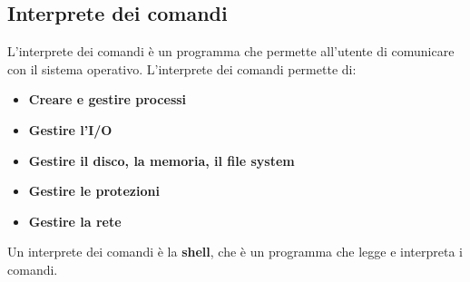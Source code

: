 \documentclass[a4paper]{article}
\begin{document}
\subsection{Interprete dei comandi}
L'interprete dei comandi è un programma che permette all'utente di comunicare con il
sistema operativo. L'interprete dei comandi permette di:
\begin{itemize}
  \item \textbf{Creare e gestire processi}
  \item \textbf{Gestire l'I/O}
  \item \textbf{Gestire il disco, la memoria, il file system}
  \item \textbf{Gestire le protezioni}
  \item \textbf{Gestire la rete}
\end{itemize}
Un interprete dei comandi è la \textbf{shell}, che è un programma che legge e interpreta i comandi.
\end{document}
